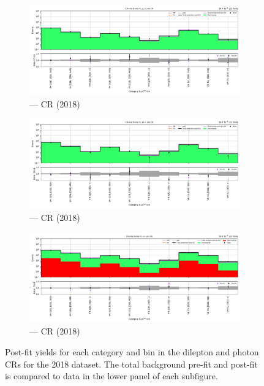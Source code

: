\begin{figure}[htbp]
    \centering
    \begin{subfigure}[b]{0.9\textwidth}
        \includegraphics[width=\textwidth]{chapters/higgstoinv/figures/mountain_ranges/2018/VH/Zmumu_tree_fit_b-abs_values_VH_cats.pdf}
        \caption{\VH --- \doubleMuCr \gls{CR} (2018)}
    \end{subfigure}

    \begin{subfigure}[b]{0.9\textwidth}
        \includegraphics[width=\textwidth]{chapters/higgstoinv/figures/mountain_ranges/2018/VH/Zee_tree_fit_b-abs_values_VH_cats.pdf}
        \caption{\VH --- \doubleEleCr \gls{CR} (2018)}
    \end{subfigure}

    \begin{subfigure}[b]{0.9\textwidth}
        \includegraphics[width=\textwidth]{chapters/higgstoinv/figures/mountain_ranges/2018/VH/Photon_tree_fit_b-abs_values_VH_cats.pdf}
        \caption{\VH --- \singlePhotonCr \gls{CR} (2018)}
    \end{subfigure}
    \caption[Post-fit yields for each \VH category and \ptmiss bin in the dilepton and photon control regions for the 2018 dataset]{Post-fit yields for each \VH category and \ptmiss bin in the dilepton and photon \glspl{CR} for the 2018 dataset. The total background pre-fit and post-fit is compared to data in the lower panel of each subfigure.}
    \label{fig:htoinv_mountain_range_VH_2018_dilep_photon_CRs}
\end{figure}

